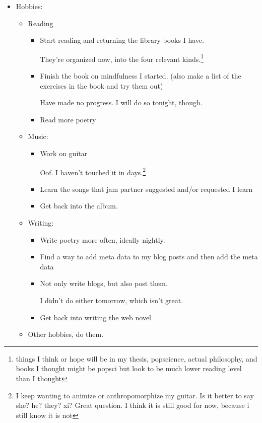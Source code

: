 \documentclass[12pt]{article}[titlepage]
\renewcommand{\,}{\textsuperscript{,}}
\begin{document}
\begin{itemize}
\begin{itemize}
\begin{itemize}
I really need to start the day with this more explicitly.  
I don't know what medium to use, though, because I don't want to be on the computer early, but I do also primarily look at the computer, these days.\footnote{see: me constantly kvetching about the amount of writing that I am to do}  
\item Continue to explicitly confront the voice in my head that says that people hate me.  
  
Spent time with friends last night, and I didn't even think that they hated me once before leaving!  
\end{itemize}  
\end{itemize}   
\item Hobbies:   
\begin{itemize}   
\item Reading  
\begin{itemize}  
\item Start reading and returning the library books I have.  
  
They're organized now, into the four relevant kinds.\footnote{things I think or hope will be in my thesis, popscience, actual philosophy, and books I thought might be popsci but look to be much lower reading level than I thought}  
\item Finish the book on mindfulness I started. (also make a list of the exercises in the book and try them out)  
  
Have made no progress. I will do so tonight, though.  
\item Read more poetry  
\end{itemize}

\item Music:   
\begin{itemize}   
\item Work on guitar  
  
Oof. I haven't touched it in days.\footnote{I keep wanting to animize or anthropomorphize my guitar. Is it better to say she? he? they? xi? Great question. I think it is still good for now, because i still know it is not}
\item Learn the songs that jam partner suggested and/or requested I learn  
\item Get back into the album.  
\end{itemize}   
\item Writing:  
\begin{itemize}   
\item Write poetry more often, ideally nightly.  
\item Find a way to add meta data to my blog posts and then add the meta data  
\item Not only write blogs, but also post them.  
  
I didn't do either tomorrow, which isn't great.  
\item Get back into writing the web novel  
\end{itemize}
\item Other hobbies, do them.  
\end{itemize}   
\end{itemize}
\end{document}
